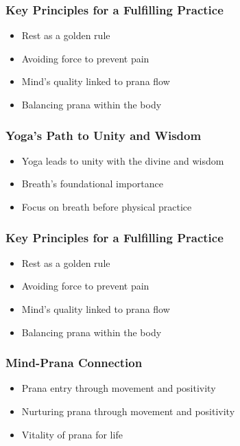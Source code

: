 \begin{frame}[fragile]\frametitle{Key Principles for a Fulfilling Practice}
\begin{itemize}
\item Rest as a golden rule
\item Avoiding force to prevent pain
\item Mind's quality linked to prana flow
\item Balancing prana within the body
\end{itemize}
\end{frame}

\begin{frame}[fragile]\frametitle{Yoga's Path to Unity and Wisdom}
\begin{itemize}
\item Yoga leads to unity with the divine and wisdom
\item Breath's foundational importance
\item Focus on breath before physical practice
\end{itemize}
\end{frame}

\begin{frame}[fragile]\frametitle{Key Principles for a Fulfilling Practice}
\begin{itemize}
\item Rest as a golden rule
\item Avoiding force to prevent pain
\item Mind's quality linked to prana flow
\item Balancing prana within the body
\end{itemize}
\end{frame}

\begin{frame}[fragile]\frametitle{Mind-Prana Connection}
\begin{itemize}
\item Prana entry through movement and positivity
\item Nurturing prana through movement and positivity
\item Vitality of prana for life
\end{itemize}
\end{frame}

